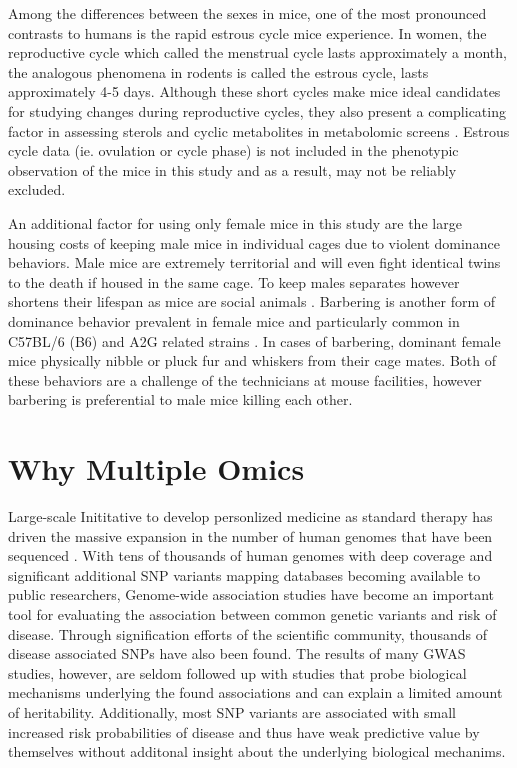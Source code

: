 \documentclass[a4paper,11pt,twoside]{book}
\begin{document}
    Among the differences between the sexes in mice, one of the most pronounced contrasts to humans is the rapid estrous cycle mice experience. In women, the reproductive cycle which called the menstrual cycle lasts approximately a month, the analogous phenomena in rodents is called the estrous cycle, lasts approximately 4-5 days\citep{Caligioni2009}. Although these short cycles make mice ideal candidates for studying changes during reproductive cycles, they also present a complicating factor in assessing sterols and cyclic metabolites in metabolomic screens \citep{Zucker2010MalesStudies}. Estrous cycle data (ie. ovulation or cycle phase) is not included in the phenotypic observation of the mice in this study and as a result, may not be reliably excluded.
	
	An additional factor for using only female mice in this study are the large housing costs of keeping male mice in individual cages due to violent dominance behaviors. Male mice are extremely territorial and will even fight identical twins to the death if housed in the same cage. To keep males separates however shortens their lifespan as mice are social animals \citep{PeterKelmenson}. Barbering is another form of dominance behavior prevalent in female mice and particularly common in C57BL/6 (B6) and A2G related strains \citep{Kalueff2006HairResearch}. In cases of barbering, dominant female mice physically nibble or pluck fur and whiskers from their cage mates\citep{PeterKelmenson}. Both of these behaviors are a challenge of the technicians at mouse facilities, however barbering is preferential to male mice killing each other.
		
	\section{Why Multiple Omics}
	
    Large-scale Inititative to develop personlized medicine as standard therapy has driven the massive expansion in the number of human genomes that have been sequenced \citep{Telenti2016Deepgenomes, Fakhro2016}. With tens of thousands of human genomes with deep coverage \citep{Telenti2016Deepgenomes} and significant additional SNP variants mapping databases becoming available to public researchers, Genome-wide association studies have become an important tool for evaluating the association between common genetic variants and risk of disease. Through signification efforts of the scientific community, thousands of disease associated SNPs have also been found\citep{Johnson2009AnResults.}. The results of many GWAS studies, however, are seldom followed up with studies that probe biological mechanisms underlying the found associations and can explain a limited amount of heritability. Additionally, most SNP variants are associated with small increased risk probabilities of disease and thus have weak predictive value by themselves without additonal insight about the underlying biological mechanims. 
	
\end{document}
